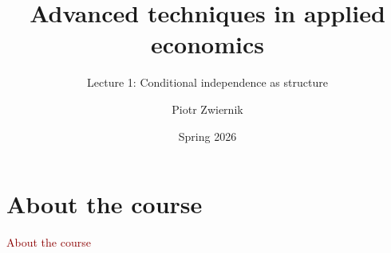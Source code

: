 \documentclass[dvipsnames,aspectratio=169,handout]{beamer}
\title{Advanced techniques in applied economics}
\subtitle{Lecture 1: Conditional independence as structure}
\author{Piotr Zwiernik}
\date{Spring 2026}
\begin{document}

\begin{frame}
\titlepage
\end{frame}


\section{About the course}

\begin{frame}{}
\begin{center}
{\huge \textcolor{DarkRed}{About the course}}
\end{center}
\end{frame}
\end{document}
